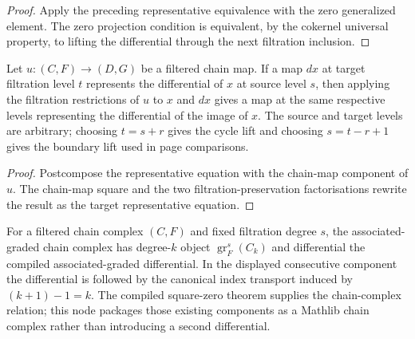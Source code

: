 \begin{proof}
  \leanok
  Apply the preceding representative equivalence with the zero generalized
  element.  The zero projection condition is equivalent, by the cokernel
  universal property, to lifting the differential through the next filtration
  inclusion.
\end{proof}

\begin{theorem}
  \label{thm:filtered-differential-representative-naturality}
  \leanok
  Let $u:(C,F)\to(D,G)$ be a filtered chain map.  If a map $dx$ at target
  filtration level $t$ represents the differential of $x$ at source level
  $s$, then applying the filtration restrictions of $u$ to $x$ and $dx$
  gives a map at the same respective levels representing the differential of
  the image of $x$.  The source and target levels are arbitrary; choosing
  $t=s+r$ gives the cycle lift and choosing $s=t-r+1$ gives the boundary lift
  used in page comparisons.
\end{theorem}

\begin{proof}
  \leanok
  Postcompose the representative equation with the chain-map component of
  $u$.  The chain-map square and the two filtration-preservation
  factorisations rewrite the result as the target representative equation.
\end{proof}

\begin{definition}
  \label{def:filtered-associated-graded-complex}
  \leanok
  For a filtered chain complex $(C,F)$ and fixed filtration degree $s$, the
  associated-graded chain complex has degree-$k$ object
  $\operatorname{gr}^s_F(C_k)$ and differential the compiled
  associated-graded differential.  In the displayed consecutive component the
  differential is followed by the canonical index transport induced by
  $(k+1)-1=k$.  The compiled square-zero theorem supplies the chain-complex
  relation; this node packages those existing components as a Mathlib chain
  complex rather than introducing a second differential.
\end{definition}

